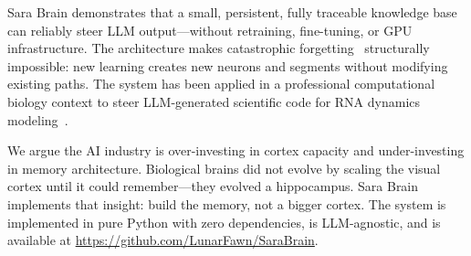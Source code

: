 \documentclass[runningheads]{llncs}
\begin{document}
Sara Brain demonstrates that a small, persistent, fully traceable knowledge base can reliably steer LLM output---without retraining, fine-tuning, or GPU infrastructure. The architecture makes catastrophic forgetting~\cite{french1999} structurally impossible: new learning creates new neurons and segments without modifying existing paths. The system has been applied in a professional computational biology context to steer LLM-generated scientific code for RNA dynamics modeling~\cite{pearl2022,pearl2024,tse2025}.

We argue the AI industry is over-investing in cortex capacity and under-investing in memory architecture. Biological brains did not evolve by scaling the visual cortex until it could remember---they evolved a hippocampus. Sara Brain implements that insight: build the memory, not a bigger cortex. The system is implemented in pure Python with zero dependencies, is LLM-agnostic, and is available at \url{https://github.com/LunarFawn/SaraBrain}.
\end{document}
